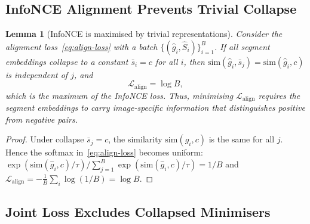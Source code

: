 \documentclass[12pt]{article}
\newtheorem{lemma}[theorem]{Lemma}
\begin{document}
\subsection{InfoNCE Alignment Prevents Trivial Collapse}

\begin{lemma}[InfoNCE is maximised by trivial representations]
\label{lem:align-collapse}
Consider the alignment loss~\eqref{eq:align-loss} with
a batch $\{(\hat{g}_i, \hat{S}_i)\}_{i=1}^{B}$.
If all segment embeddings collapse to a constant
$\bar{s}_i = c$ for all $i$, then
$\mathrm{sim}(\hat{g}_i, \bar{s}_j) = \mathrm{sim}(\hat{g}_i, c)$
is independent of $j$, and
\begin{equation}
    \mathcal{L}_{\mathrm{align}} = \log B,
\end{equation}
which is the maximum of the InfoNCE loss.
Thus, minimising $\mathcal{L}_{\mathrm{align}}$ requires the
segment embeddings to carry image-specific information that
distinguishes positive from negative pairs.
\end{lemma}

\begin{proof}
Under collapse $\bar{s}_j = c$, the similarity
$\mathrm{sim}(\hat{g}_i, c)$ is the same for all $j$.
Hence the softmax in~\eqref{eq:align-loss} becomes uniform:
$\exp(\mathrm{sim}(\hat{g}_i, c)/\tau) / \sum_{j=1}^{B}\exp(\mathrm{sim}(\hat{g}_i, c)/\tau) = 1/B$
and $\mathcal{L}_{\mathrm{align}} = -\frac{1}{B}\sum_i \log(1/B) = \log B$.
\end{proof}

\subsection{Joint Loss Excludes Collapsed Minimisers}
\end{document}
